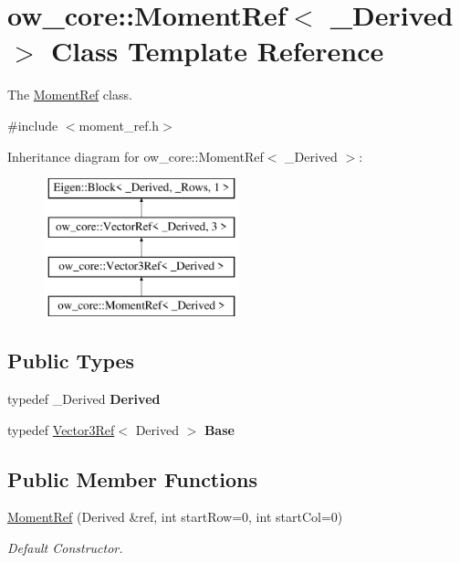 \hypertarget{classow__core_1_1MomentRef}{}\section{ow\+\_\+core\+:\+:Moment\+Ref$<$ \+\_\+\+Derived $>$ Class Template Reference}
\label{classow__core_1_1MomentRef}


The \hyperlink{classow__core_1_1MomentRef}{Moment\+Ref} class.  




{\ttfamily \#include $<$moment\+\_\+ref.\+h$>$}

Inheritance diagram for ow\+\_\+core\+:\+:Moment\+Ref$<$ \+\_\+\+Derived $>$\+:\begin{figure}[H]
\begin{center}
\leavevmode
\includegraphics[height=4.000000cm]{de/d46/classow__core_1_1MomentRef}
\end{center}
\end{figure}
\subsection*{Public Types}
\begin{DoxyCompactItemize}
\item 
typedef \+\_\+\+Derived {\bfseries Derived}\hypertarget{classow__core_1_1MomentRef_a8381c7f3d2123c9d388b41dfa746f77d}{}\label{classow__core_1_1MomentRef_a8381c7f3d2123c9d388b41dfa746f77d}

\item 
typedef \hyperlink{classow__core_1_1Vector3Ref}{Vector3\+Ref}$<$ Derived $>$ {\bfseries Base}\hypertarget{classow__core_1_1MomentRef_a410591bc3879bc60e71b950e769bb031}{}\label{classow__core_1_1MomentRef_a410591bc3879bc60e71b950e769bb031}

\end{DoxyCompactItemize}
\subsection*{Public Member Functions}
\begin{DoxyCompactItemize}
\item 
\hyperlink{classow__core_1_1MomentRef_adafe9b697d0c0b3a2671e13680dfcd0f}{Moment\+Ref} (Derived \&ref, int start\+Row=0, int start\+Col=0)
\begin{DoxyCompactList}\small\item\em Default Constructor. \end{DoxyCompactList}\end{DoxyCompactItemize}


